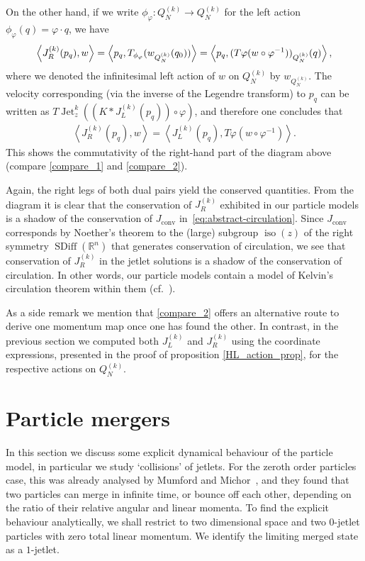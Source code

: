 \documentclass[12pt]{amsart}
\newcommand{\je}[1]{\todo[inline,color=green!20]{JE:  #1}}
\newcommand{\R}{\ensuremath{\mathbb{R}}}
\DeclareMathOperator{\SDiff}{SDiff}
\DeclareMathOperator{\Jet}{Jet}
\DeclareMathOperator{\iso}{iso}
\begin{document}
 On the other hand, if we write $\phi_\varphi: Q^{(k)}_N \to Q^{(k)}_N$ for the left action $\phi_\varphi (q) = \varphi \cdot q$, we have 
 \begin{align}
 	\left<J_R^{(k)}(p_q), w\right> = \left< p_q, T_{\phi_\varphi} (w_{Q^{(k)}_N} (q_0))   \right> =  \left<p_q, (T\varphi (w \circ \varphi^{-1}) )_{Q^{(k)}_N} (q) \right>, \notag \end{align}
 where we denoted the infinitesimal left action of $w$ on $Q^{(k)}_N$ by $w_{Q^{(k)}_N}$. The velocity corresponding (via the inverse of the Legendre transform) to $p_q$ can be written as $ T\Jet_z^k( (K * J_L^{(k)}(p_q)) \circ \varphi)$,
 and therefore one concludes that 
 \begin{align}
 	\left<J_R^{(k)}(p_q), w\right> = \left< J_L^{(k)}(p_q), T \varphi (w \circ \varphi^{-1}) \right>. \label{compare_2}
 \end{align}
 This shows the commutativity of the right-hand part of the  diagram above (compare \eqref{compare_1} and \eqref{compare_2}).
  
  Again, the right legs of both dual pairs yield the conserved quantities.
From the diagram it is clear that the conservation of $J_R^{(k)}$ exhibited in
our particle models is a shadow of the conservation of $J_\text{conv}$ in~\eqref{eq:abstract-circulation}.
Since $J_\text{conv}$ corresponds by Noether's theorem to the (large)
subgroup $\iso(z)$ of the right symmetry $\SDiff(\R^n)$ that generates
conservation of circulation, we see that conservation of $J_R^{(k)}$ in the jetlet solutions is a shadow
of the conservation of circulation.
In other words, our particle models contain a model of Kelvin's circulation theorem within them (cf.~\cite[Theorem 5.5]{JacobsRatiuDesbrun2013}).

As a side remark we mention that \eqref{compare_2} offers an alternative route to derive one momentum map once one has found the other. In contrast,  in the previous section we computed both $J_L^{(k)}$ and $J_R^{(k)}$ using the coordinate expressions, presented in the proof of proposition \ref{HL_action_prop},  for the respective actions on $Q^{(k)}_N$.


\section{Particle mergers}
\label{sec:collisions}

In this section we discuss some explicit dynamical behaviour of the
particle model, in particular we study `collisions' of jetlets. For
the zeroth order particles case, this was already analysed by Mumford
and Michor~\cite{MumfordMichor2013}, and they found that two
particles can merge in infinite time, or bounce off each other,
depending on the ratio of their relative angular and linear momenta.
To find the explicit behaviour analytically, we shall restrict to two
dimensional space and two $0$-jetlet particles with zero total linear
momentum. We identify the limiting merged state as a $1$-jetlet.
\je{still todo}
\end{document}

